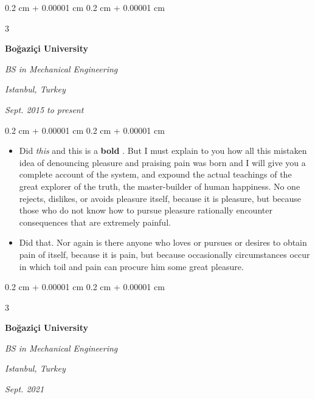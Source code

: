 \documentclass[10pt, letterpaper]{article}
\newenvironment{highlights}{
    \begin{itemize}[
        topsep=0.10 cm,
        parsep=0.10 cm,
        partopsep=0pt,
        itemsep=0pt,
        leftmargin=0.4 cm + 10pt + 0.6 cm
    ]
}{
    \end{itemize}
} %
\newenvironment{onecolentry}{
    \begin{adjustwidth}{
        0.2 cm + 0.00001 cm
    }{
        0.2 cm + 0.00001 cm
    }
}{
    \end{adjustwidth}
} %
\newenvironment{threecolentry}[3][]{
    \onecolentry
    \def\thirdColumn{#3}
    \setcolumnwidth{0.6 cm, \fill, 4.5 cm}
    \begin{paracol}{3}
    #2 \switchcolumn
}{
    \switchcolumn \raggedleft \thirdColumn
    \end{paracol}
    \endonecolentry
} %
\let\hrefWithoutArrow\href
\renewcommand{\href}[2]{\hrefWithoutArrow{#1}{\mbox{\ifthenelse{\equal{#2}{}}{ }{#2 }\raisebox{.15ex}{\footnotesize \faExternalLink*}}}}
\begin{document}
        \vspace{0.2 cm-3px}

        \begin{threecolentry}{
            \vspace*{\fill}
            \textbullet
            \vspace*{3px}
            \vspace*{\fill}
        }{
        \textit{Istanbul, Turkey}    
            
        \textit{Sept. 2015 to present}}
            \textbf{Boğaziçi University}

            \textit{BS in Mechanical Engineering}
        \end{threecolentry}

        \vspace{0.10 cm-3px}
        \begin{onecolentry}
            \begin{highlights}
                \item Did \textit{this} and this is a \textbf{bold} \href{https://example.com}{link}. But I must explain to you how all this mistaken idea of denouncing pleasure and praising pain was born and I will give you a complete account of the system, and expound the actual teachings of the great explorer of the truth, the master-builder of human happiness. No one rejects, dislikes, or avoids pleasure itself, because it is pleasure, but because those who do not know how to pursue pleasure rationally encounter consequences that are extremely painful.
                \item Did that. Nor again is there anyone who loves or pursues or desires to obtain pain of itself, because it is pain, but because occasionally circumstances occur in which toil and pain can procure him some great pleasure.
            \end{highlights}
        \end{onecolentry}


        \vspace{0.2 cm-3px}

        \begin{threecolentry}{
            \vspace*{\fill}
            \textbullet
            \vspace*{3px}
            \vspace*{\fill}
        }{
        \textit{Istanbul, Turkey}    
            
        \textit{Sept. 2021}}
            \textbf{Boğaziçi University}

            \textit{BS in Mechanical Engineering}
        \end{threecolentry}
\end{document}

